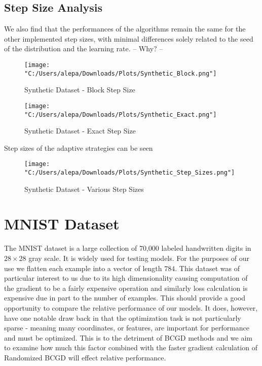 \documentclass{article}
\begin{document}
\subsection{Step Size Analysis}
We also find that the performances of the algorithms remain the same for the other implemented step sizes, with minimal differences solely related to the seed of the distribution and the learning rate. -- Why? --

\begin{figure}[H]
    \centering
    \texttt{[image: "C:/Users/alepa/Downloads/Plots/Synthetic\_Block.png"]}
    \caption{Synthetic Dataset - Block Step Size}
    \label{fig:synthetic_block}
\end{figure}

\begin{figure}[H]
    \centering
    \texttt{[image: "C:/Users/alepa/Downloads/Plots/Synthetic\_Exact.png"]}
    \caption{Synthetic Dataset - Exact Step Size}
    \label{fig:synthetic_exact}
\end{figure}

Step sizes of the adaptive strategies can be seen
\begin{figure}[H]
    \centering
    \texttt{[image: "C:/Users/alepa/Downloads/Plots/Synthetic\_Step\_Sizes.png"]}
    \caption{Synthetic Dataset - Various Step Sizes}
    \label{fig:synthetic_step_sizes}
\end{figure}


\section{MNIST Dataset}
The MNIST dataset is a large collection of 70,000 labeled handwritten digits in $28\times28$ gray scale. It is widely used for testing models. For the purposes of our use we flatten each example into a vector of length $784$. This dataset was of particular interest to us due to its high dimensionality causing computation of the gradient to be a fairly expensive operation and similarly loss calculation is expensive due in part to the number of examples. This should provide a good opportunity to compare the relative performance of our models. It does, however, have one notable draw back in that the optimization task is not particularly sparse - meaning many coordinates, or features, are important for performance and must be optimized. This is to the detriment of BCGD methods and we aim to examine how much this factor combined with the faster gradient calculation of Randomized BCGD will effect relative performance.
\end{document}
